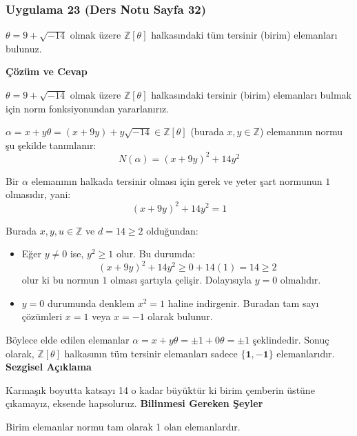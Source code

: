 \documentclass[11pt, a4paper]{article}
\newenvironment{cozum}{
    \vspace{0.5cm}
    \noindent\textcolor{green!60!black}{\faCheckCircle\enspace \textbf{\Large Çözüm ve Cevap}}\par\vspace{0.2cm}
}{}
\newenvironment{sezgisel}{
    \vspace{0.5cm}
    \noindent\textcolor{orange!80!black}{\faLightbulb\enspace \textbf{\Large Sezgisel Açıklama}}\par\vspace{0.2cm}
    \itshape
}{}
\newenvironment{bilgi}{
    \vspace{0.5cm}
    \noindent\textcolor{red!70!black}{\faExclamationTriangle\enspace \textbf{\Large Bilinmesi Gereken Şeyler}}\par\vspace{0.2cm}
}{}
\begin{document}
\subsubsection{Uygulama 23 (Ders Notu Sayfa 32)}
\begin{sorubox}
$\theta = 9 + \sqrt{-14}$ olmak üzere $\mathbb{Z}[\theta]$ halkasındaki tüm tersinir (birim) elemanları bulunuz.
\end{sorubox}
\begin{cozum}
$\theta = 9 + \sqrt{-14}$ olmak üzere $\mathbb{Z}[\theta]$ halkasındaki tersinir (birim) elemanları bulmak için norm fonksiyonundan yararlanırız.

$\alpha = x + y\theta = (x + 9y) + y\sqrt{-14} \in \mathbb{Z}[\theta]$ (burada $x, y \in \mathbb{Z}$) elemanının normu şu şekilde tanımlanır:
\[ N(\alpha) = (x + 9y)^2 + 14 y^2 \]

Bir $\alpha$ elemanının halkada tersinir olması için gerek ve yeter şart normunun $1$ olmasıdır, yani:
\[ (x + 9y)^2 + 14 y^2 = 1 \]

Burada $x, y, u \in \mathbb{Z}$ ve $d = 14 \ge 2$ olduğundan:
\begin{itemize}
    \item Eğer $y \neq 0$ ise, $y^2 \ge 1$ olur. Bu durumda:
    \[ (x + 9y)^2 + 14 y^2 \ge 0 + 14(1) = 14 \ge 2 \]
    olur ki bu normun $1$ olması şartıyla çelişir. Dolayısıyla $y = 0$ olmalıdır.
    \item $y = 0$ durumunda denklem $x^2 = 1$ haline indirgenir. Buradan tam sayı çözümleri $x = 1$ veya $x = -1$ olarak bulunur.
\end{itemize}

Böylece elde edilen elemanlar $\alpha = x + y\theta = \pm 1 + 0\theta = \pm 1$ şeklindedir. Sonuç olarak, $\mathbb{Z}[\theta]$ halkasının tüm tersinir elemanları sadece $\mathbf{\{1, -1\}}$ elemanlarıdır.
\end{cozum}
\begin{sezgisel}
Karmaşık boyutta katsayı 14 o kadar büyüktür ki birim çemberin üstüne çıkamayız, eksende hapsoluruz.
\end{sezgisel}
\begin{bilgi}
Birim elemanlar normu tam olarak 1 olan elemanlardır.
\end{bilgi}

\newpage
\end{document}
